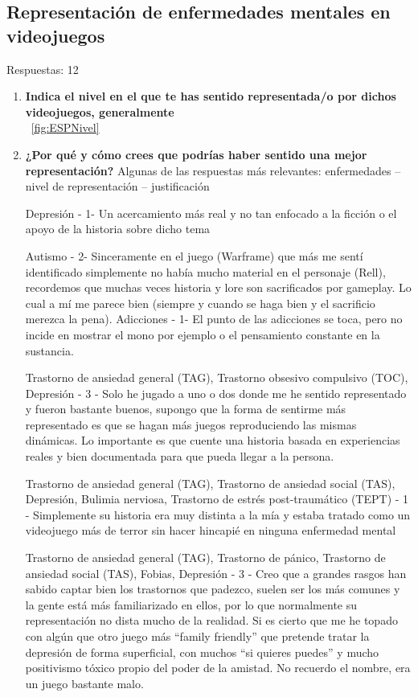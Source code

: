 \documentclass[12pt, a4paper,twoside,titlepage]{book}
\begin{document}
\subsection{Representación de enfermedades mentales en videojuegos}
Respuestas: 12
\begin{enumerate}[label=\textbf{\arabic*}.]
     \item \textbf{Indica el nivel en el que te has sentido representada/o por dichos videojuegos, generalmente}\\
    ~\ref{fig:ESPNivel}
     \item \textbf{¿Por qué y cómo crees que podrías haber sentido una mejor representación?}
    \label{representacionCastellano}
    Algunas de las respuestas más relevantes: enfermedades – nivel de representación – justificación 
    
    Depresión - 1- Un acercamiento más real y no tan enfocado a la ficción o el apoyo de la historia sobre dicho tema
    
    Autismo - 2- Sinceramente en el juego (Warframe) que más me sentí identificado simplemente no había mucho material en el personaje (Rell), recordemos que muchas veces historia y lore son sacrificados por gameplay. Lo cual a mí me parece bien (siempre y cuando se haga bien y el sacrificio merezca la pena).
    Adicciones - 1- El punto de las adicciones se toca, pero no incide en mostrar el mono por ejemplo o el pensamiento constante en la sustancia.
    
    Trastorno de ansiedad general (TAG), Trastorno obsesivo compulsivo (TOC), Depresión - 3 - Solo he jugado a uno o dos donde me he sentido representado y fueron bastante buenos, supongo que la forma de sentirme más representado es que se hagan más juegos reproduciendo las mismas dinámicas. Lo importante es que cuente una historia basada en experiencias reales y bien documentada para que pueda llegar a la persona.
    
    Trastorno de ansiedad general (TAG), Trastorno de ansiedad social (TAS), Depresión, Bulimia nerviosa, Trastorno de estrés post-traumático (TEPT) - 1 - Simplemente su historia era muy distinta a la mía y estaba tratado como un videojuego más de terror sin hacer hincapié en ninguna enfermedad mental 
    
    Trastorno de ansiedad general (TAG), Trastorno de pánico, Trastorno de ansiedad social (TAS), Fobias, Depresión - 3 - Creo que a grandes rasgos han sabido captar bien los trastornos que padezco, suelen ser los más comunes y la gente está más familiarizado en ellos, por lo que normalmente su representación no dista mucho de la realidad. Si es cierto que me he topado con algún que otro juego más ``family friendly'' que pretende tratar la depresión de forma superficial, con muchos ``si quieres puedes'' y mucho positivismo tóxico propio del poder de la amistad. No recuerdo el nombre, era un juego bastante malo.
    

\end{enumerate}
\end{document}

